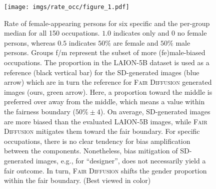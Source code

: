 \documentclass{article}%
\begin{document}
\begin{figure}[t]
    \centering
    \texttt{[image: imgs/rate\_occ/figure\_1.pdf]}
    \caption{Rate of female-appearing persons for six specific and the per-group median for all 150 occupations. $1.0$ indicates only and $0$ no female persons, whereas $0.5$ indicates $50\%$ are female and $50\%$ male persons.
    Groups f/m represent the subset of more (fe)male-biased occupations. The proportion in the LAION-5B dataset is used as a reference (black vertical bar) for the SD-generated images (blue arrow) which are in turn the reference for \textsc{Fair Diffusion} generated images (ours, green arrow). Here, a proportion toward the middle is preferred over away from the middle, which means a value within the fairness boundary ($50\%\!\pm\!4$). On average, SD-generated images are more biased than the evaluated LAION-5B images, while \textsc{Fair Diffusion} mitigates them toward the fair boundary. For specific occupations, there is no clear tendency for bias amplification between the components. Nonetheless, bias mitigation of SD-generated images, e.g., for ``designer'', does not necessarily yield a fair outcome. In turn, \textsc{Fair Diffusion} shifts the gender proportion within the fair boundary. (Best viewed in color)}
    \label{fig:gender_proportion}
\end{figure}
\end{document}
